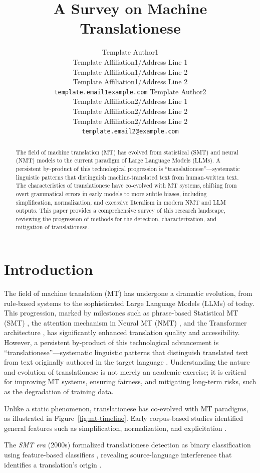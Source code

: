 \documentclass[11pt,a4paper]{article}
\title{A Survey on Machine Translationese}
\author{
  Template Author1\Thanks{The {\em actual} contributors to this instruction
    document and corresponding template file are given in Section
    \ref{sec:contributors}.} 
  \\
  Template Affiliation1/Address Line 1
  \\
  Template Affiliation1/Address Line 2
  \\
  Template Affiliation1/Address Line 2
  \\
  \texttt{template.email1example.com}
  \And
  Template Author2 
  \\
  Template Affiliation2/Address Line 1
  \\
  Template Affiliation2/Address Line 2
  \\
  Template Affiliation2/Address Line 2
  \\
  \texttt{template.email2@example.com}
}
\date{}
\begin{document}
\maketitle
\begin{abstract}
  The field of machine translation (MT) has evolved from statistical (SMT) and neural (NMT) models to the current paradigm of Large Language Models (LLMs). A persistent by-product of this technological progression is ``translationese''---systematic linguistic patterns that distinguish machine-translated text from human-written text. The characteristics of translationese have co-evolved with MT systems, shifting from overt grammatical errors in early models to more subtle biases, including simplification, normalization, and excessive literalism in modern NMT and LLM outputs. This paper provides a comprehensive survey of this research landscape, reviewing the progression of methods for the detection, characterization, and mitigation of translationese.
\end{abstract}

\section{Introduction}

The field of machine translation (MT) has undergone a dramatic evolution, from rule-based systems to the sophisticated Large Language Models (LLMs) of today. This progression, marked by milestones such as phrase-based Statistical MT (SMT) \cite{koehn2003statistical}, the attention mechanism in Neural MT (NMT) \cite{bahdanau2015neural}, and the Transformer architecture \cite{vaswani2017attention}, has significantly enhanced translation quality and accessibility. However, a persistent by-product of this technological advancement is ``translationese''---systematic linguistic patterns that distinguish translated text from text originally authored in the target language \cite{gellerstam1986translationese}. Understanding the nature and evolution of translationese is not merely an academic exercise; it is critical for improving MT systems, ensuring fairness, and mitigating long-term risks, such as the degradation of training data.

Unlike a static phenomenon, translationese has co-evolved with MT paradigms, as illustrated in Figure~\ref{fig:mt-timeline}. Early corpus-based studies identified general features such as simplification, normalization, and explicitation \cite{laviosa1998corpus}.

The \textit{SMT era} (2000s) formalized translationese detection as binary classification using feature-based classifiers \cite{baroni2006new,volansky2015features}, revealing source-language interference that identifies a translation's origin \cite{koppel2011translationese,van2008source}.
\end{document}
